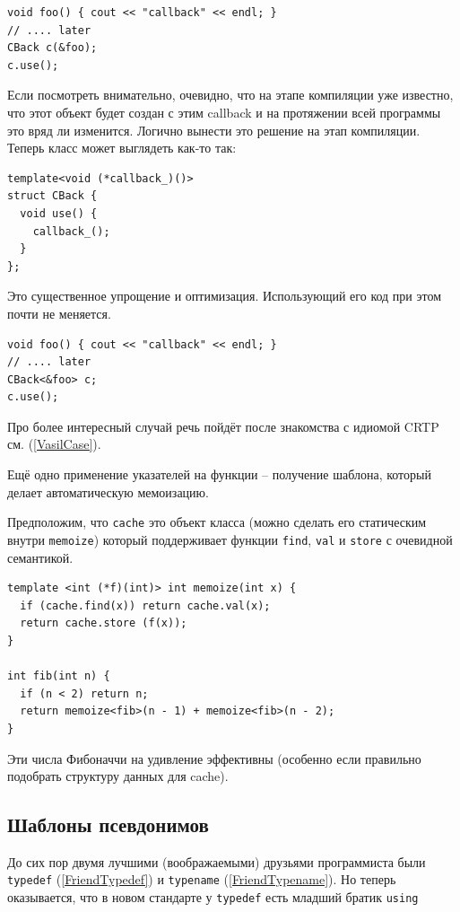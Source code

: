 \documentclass[a4paper,12pt,oneside]{book}
\begin{document}
\begin{lstlisting}
void foo() { cout << "callback" << endl; }
// .... later
CBack c(&foo);
c.use();
\end{lstlisting}

Если посмотреть внимательно, очевидно, что на этапе компиляции уже известно, что этот объект будет создан с этим callback и на протяжении всей программы это вряд ли изменится. Логично вынести это решение на этап компиляции. Теперь класс может выглядеть как-то так:

\begin{lstlisting}
template<void (*callback_)()>
struct CBack {
  void use() {
    callback_();
  }
}; 
\end{lstlisting}

Это существенное упрощение и оптимизация. Использующий его код при этом почти не меняется.

\begin{lstlisting}
void foo() { cout << "callback" << endl; }
// .... later
CBack<&foo> c;
c.use();
\end{lstlisting}

Про более интересный случай речь пойдёт после знакомства с идиомой CRTP см. (\ref{VasilCase}).

Ещё одно применение указателей на функции -- получение шаблона, который делает автоматическую мемоизацию.

Предположим, что \lstinline!cache! это объект класса (можно сделать его статическим внутри \lstinline!memoize!) который поддерживает функции \lstinline!find!, \lstinline!val! и \lstinline!store! с очевидной семантикой.

\begin{lstlisting}
template <int (*f)(int)> int memoize(int x) {
  if (cache.find(x)) return cache.val(x);
  return cache.store (f(x));
}

int fib(int n) {
  if (n < 2) return n;
  return memoize<fib>(n - 1) + memoize<fib>(n - 2);
}
\end{lstlisting}

Эти числа Фибоначчи на удивление эффективны (особенно если правильно подобрать структуру данных для cache).

\subsection{Шаблоны псевдонимов}\label{FriendUsing}

До сих пор двумя лучшими (воображаемыми) друзьями программиста были \lstinline!typedef! (\ref{FriendTypedef}) и \lstinline!typename! (\ref{FriendTypename}). Но теперь оказывается, что в новом стандарте у \lstinline!typedef! есть младший братик \lstinline!using!
\end{document}
